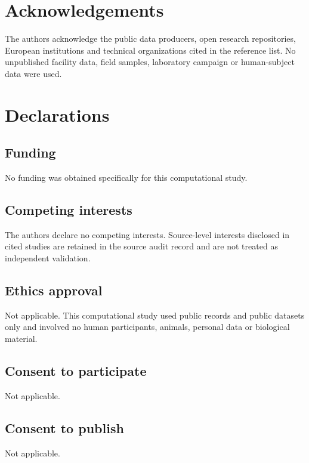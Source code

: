 \documentclass[pdflatex,sn-basic]{sn-jnl}
\begin{document}
\section*{Acknowledgements}

The authors acknowledge the public data producers, open research repositories, European institutions and technical organizations cited in the reference list. No unpublished facility data, field samples, laboratory campaign or human-subject data were used.



\section*{Declarations}

\subsection*{Funding}

No funding was obtained specifically for this computational study.

\subsection*{Competing interests}

The authors declare no competing interests. Source-level interests disclosed in cited studies are retained in the source audit record and are not treated as independent validation.

\subsection*{Ethics approval}

Not applicable. This computational study used public records and public datasets only and involved no human participants, animals, personal data or biological material.

\subsection*{Consent to participate}

Not applicable.

\subsection*{Consent to publish}

Not applicable.
\end{document}

